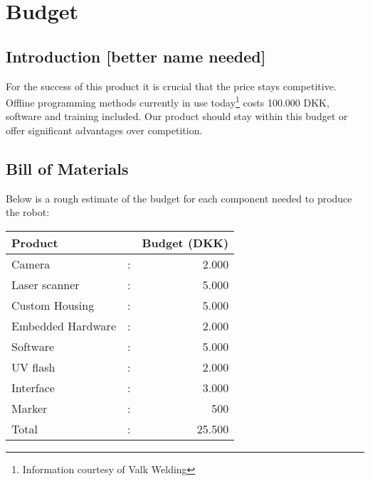 \section{Budget}
\subsection{Introduction [better name needed]}
For the success of this product it is crucial that the price stays competitive. Offline programming methods currently in use today\footnote{Information courtesy of Valk Welding} costs 100.000 DKK, software and training included. Our product should stay within this budget or offer significant advantages over competition.
\subsection{Bill of Materials}
Below is a rough estimate of the budget for each component needed to produce the robot:
\begin{center}
\begin{tabular}{l c r}
Product            & & Budget (DKK)\\
\hline
Camera & : & 2.000  \\
Laser scanner& : & 5.000 \\
Custom Housing& : & 5.000\\
Embedded Hardware& : & 2.000\\
Software& : & 5.000\\
UV flash& : & 2.000\\
Interface& : & 3.000\\
Marker& : & 500\\[0.2cm]
\hline
Total& : & 25.500\\ 
\end{tabular}
\end{center}

